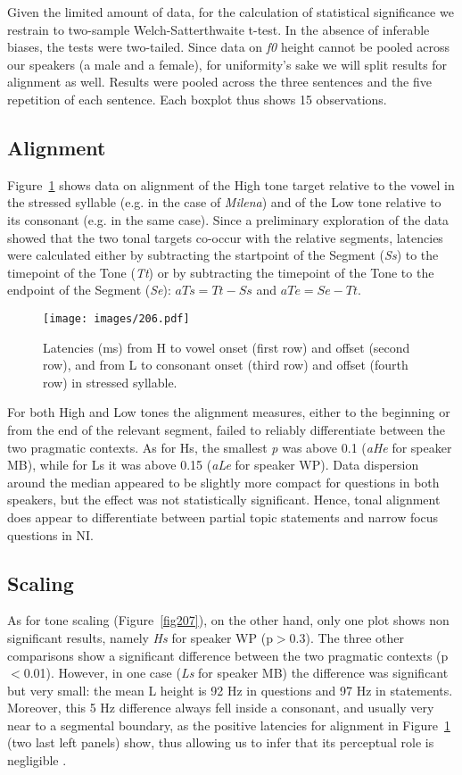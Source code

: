 Given the limited amount of data, for the calculation of statistical significance we restrain to two-sample Welch-Satterthwaite t-test. In the absence of inferable biases, the tests were two-tailed. Since data on \textit{f0} height cannot be pooled across our speakers (a male and a female), for uniformity's sake we will split results for alignment as well. Results were pooled across the three sentences and the five repetition of each sentence. Each boxplot thus shows 15 observations.

\subsection{Alignment}\label{sec231}
Figure~\ref{fig206} shows data on alignment of the High tone target relative to the vowel in the stressed syllable (e.g. \textipa{[E]} in the case of \textit{Milena}) and of the Low tone relative to its consonant (e.g. \textipa{[l]} in the same case). Since a preliminary exploration of the data showed that the two tonal targets co-occur with the relative segments, latencies were calculated either by subtracting the startpoint of the Segment (\textit{Ss}) to the timepoint of the Tone (\textit{Tt}) or by subtracting the timepoint of the Tone to the endpoint of the Segment (\textit{Se}): $ aTs = Tt - Ss $ and $ aTe = Se - Tt $. 

\begin{figure}
\centering
\texttt{[image: images/206.pdf]}
\caption{Latencies (ms) from H to vowel onset (first row) and offset (second row), and from L to consonant onset (third row) and offset (fourth row) in stressed syllable.}
\label{fig206}\end{figure}

For both High and Low tones the alignment measures, either to the beginning or from the end of the relevant segment, failed to reliably differentiate between the two pragmatic contexts. As for Hs, the smallest \textit{p} was above 0.1 (\textit{aHe} for speaker MB), while for Ls it was above 0.15 (\textit{aLe} for speaker WP). Data dispersion around the median appeared to be slightly more compact for questions in both speakers, but the effect was not statistically significant. Hence, tonal alignment does appear to differentiate between partial topic statements and narrow focus questions in NI.

\subsection{Scaling}\label{sec232}
As for tone scaling (Figure~\ref{fig207}), on the other hand, only one plot shows non significant results, namely \textit{Hs} for speaker WP (p$>$0.3). The three other comparisons show a significant difference between the two pragmatic contexts (p$<$0.01). However, in one case (\textit{Ls} for speaker MB) the difference was significant but very small: the mean L height is 92 Hz in questions and 97 Hz in statements. Moreover, this 5 Hz difference always fell inside a consonant, and usually very near to a segmental boundary, as the positive latencies for alignment in Figure~\ref{fig206} (two last left panels) show, thus allowing us to infer that its perceptual role is negligible \citep{house1990tonal}. 

